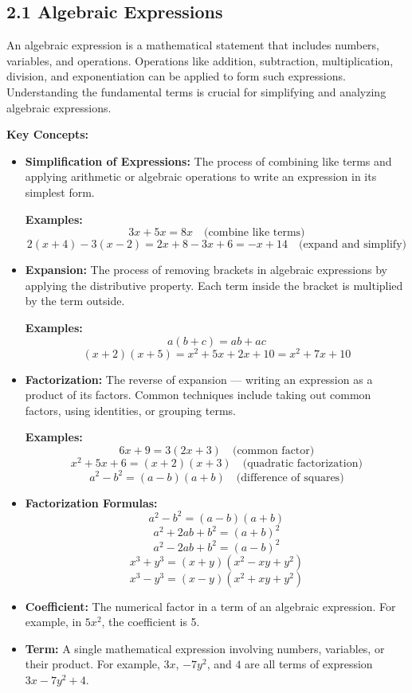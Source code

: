 
\subsection*{2.1 Algebraic Expressions}
An algebraic expression is a mathematical statement that includes numbers, variables, and operations. Operations like addition, subtraction, multiplication, division, and exponentiation can be applied to form such expressions. Understanding the fundamental terms is crucial for simplifying and analyzing algebraic expressions.

\textbf{Key Concepts:}
\begin{itemize}
\item \textbf{Simplification of Expressions:} The process of combining like terms and applying arithmetic or algebraic operations to write an expression in its simplest form.

\textbf{Examples:}
\[
3x + 5x = 8x \quad \text{(combine like terms)}
\]
\[
2(x + 4) - 3(x - 2) = 2x + 8 - 3x + 6 = -x + 14 \quad \text{(expand and simplify)}
\]

    \item \textbf{Expansion:} The process of removing brackets in algebraic expressions by applying the distributive property. Each term inside the bracket is multiplied by the term outside.

\textbf{Examples:}
\[
a(b + c) = ab + ac
\]
\[
(x + 2)(x + 5) = x^2 + 5x + 2x + 10 = x^2 + 7x + 10
\]
\item \textbf{Factorization:} The reverse of expansion — writing an expression as a product of its factors. Common techniques include taking out common factors, using identities, or grouping terms.

\textbf{Examples:}
\[
6x + 9 = 3(2x + 3) \quad \text{(common factor)}
\]
\[
x^2 + 5x + 6 = (x + 2)(x + 3) \quad \text{(quadratic factorization)}
\]
\[
a^2 - b^2 = (a - b)(a + b) \quad \text{(difference of squares)}
\]

    \item \textbf{Factorization Formulas:} 
\[
a^2 - b^2 = (a-b)(a+b)
\]
\[
a^2 + 2ab + b^2 = (a+b)^2
\]
\[
a^2 - 2ab + b^2 = (a-b)^2
\]
\[
x^3 + y^3 = (x+y)(x^2 - xy + y^2)
\]
\[
x^3 - y^3 = (x-y)(x^2 + xy + y^2)
\]

    \item \textbf{Coefficient:} The numerical factor in a term of an algebraic expression. For example, in $5x^2$, the coefficient is 5.

\item \textbf{Term:} A single mathematical expression involving numbers, variables, or their product. For example, $3x$, $-7y^2$, and $4$ are all terms of expression $3x-7y^2+4$.


\end{itemize}
